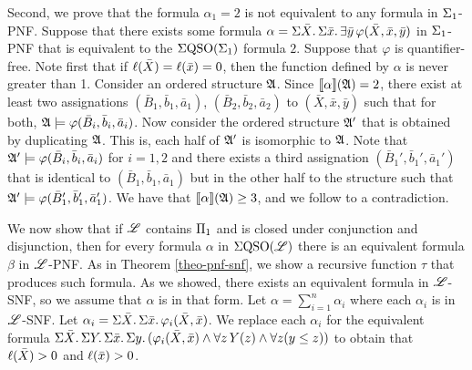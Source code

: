 \vspace{1em}
Second, we prove that the formula $\alpha_{1} = 2$ is not equivalent to any formula in $\Sigma_{1}$-PNF. Suppose that there exists some formula $\alpha = \Sigma{\bar{X}}.\,\Sigma{\bar{x}}.\,\exists\bar{y}\, \varphi(\bar{X},\bar{x},\bar{y})$ in $\Sigma_{1}$-PNF that is equivalent to the $\Sigma{\rm QSO}(\Sigma_{1})$ formula $2$. Suppose that $\varphi$ is quantifier-free. Note first that if $\ell(\bar{X}) = \ell(\bar{x}) = 0$, then the function defined by $\alpha$ is never greater than 1. Consider an ordered structure $\mathfrak{A}$. Since ${\llbracket{}{\alpha}\rrbracket}(\mathfrak{A}) = 2$, there exist at least two assignations $(\bar{B}_1,\bar{b}_1,\bar{a}_1)$, $(\bar{B}_2,\bar{b}_2,\bar{a}_2)$ to $(\bar{X},\bar{x},\bar{y})$ such that for both, $\mathfrak{A}\models\varphi(\bar{B}_i,\bar{b}_i,\bar{a}_i)$. Now consider the ordered structure $\mathfrak{A}'$ that is obtained by duplicating $\mathfrak{A}$. This is, each half of $\mathfrak{A}'$ is isomorphic to $\mathfrak{A}$. Note that $\mathfrak{A}'\models\varphi(\bar{B}_i,\bar{b}_i,\bar{a}_i)$ for $i = 1,2$ and there exists a third assignation $(\bar{B}_1',\bar{b}_1',\bar{a}_1')$ that is identical to $(\bar{B}_1,\bar{b}_1,\bar{a}_1)$ but in the other half to the structure such that $\mathfrak{A}'\models\varphi(\bar{B}_1',\bar{b}_1',\bar{a}_1')$. We have that ${\llbracket{}{\alpha}\rrbracket}(\mathfrak{A}) \geq 3$, and we follow to a contradiction.

\vspace{1em}
We now show that if $\mathscr{L}$ contains $\Pi_{1}$ and is closed under conjunction and disjunction, then for every formula $\alpha$ in $\Sigma{\rm QSO}(\mathscr{L})$ there is an equivalent formula $\beta$ in $\mathscr{L}$-PNF. As in Theorem \ref{theo-pnf-snf}, we show a recursive function $\tau$ that produces such formula. As we showed, there exists an equivalent formula in $\mathscr{L}$-SNF, so we assume that $\alpha$ is in that form. Let $\alpha = \sum_{i = 1}^n \alpha_i$ where each $\alpha_i$ is in $\mathscr{L}$-SNF. Let $\alpha_i = \Sigma{\bar{X}}.\,\Sigma{\bar{x}}.\,\varphi_i(\bar{X},\bar{x})$. We replace each $\alpha_i$ for the equivalent formula $\Sigma{\bar{X}}.\,\Sigma{Y}.\,\Sigma{\bar{x}}.\,\Sigma{y}.\,(\varphi_i(\bar{X},\bar{x})\wedge\forall z\,Y(z) \wedge \forall z(y \leq z))$ to obtain that $\ell(\bar{X}) > 0$ and $\ell(\bar{x}) > 0$. 

